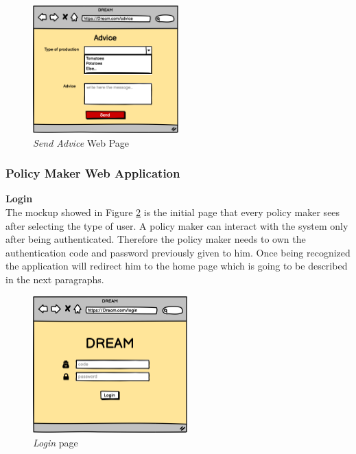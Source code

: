 \begin{figure}[H]
    \begin{center}
    \includegraphics[width=0.5\textwidth]{images/mockups/Advice.png}
    \caption{\emph{Send Advice} Web Page}
    \label{fig:advice}
    \end{center}
\end{figure}

\subsubsection{Policy Maker Web Application}
\textbf{Login} \\
The mockup showed in Figure \ref{fig:pmlogin} is the initial page that every policy maker sees after selecting the type of user.
A policy maker can interact with the system only after being authenticated. Therefore the policy maker needs to own the authentication code and password previously given to him.
Once being recognized the application will redirect him to the home page which is going to be described in the next paragraphs.

\begin{figure}[H]
    \begin{center}
        \includegraphics[width=0.53\textwidth]{images/mockups/PMLogIn.png}
        \caption{\emph{Login} page}
        \label{fig:pmlogin}
    \end{center}
\end{figure}

